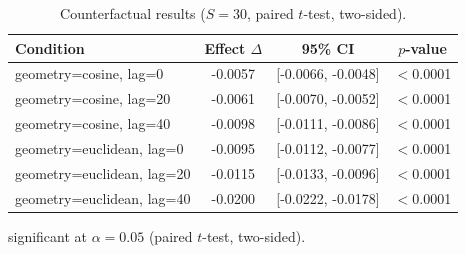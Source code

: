 \begin{table}[t]
  \centering
  \caption{Counterfactual results ($S=30$, paired $t$-test, two-sided).}
  \label{tab:counterfactual}
  \begin{tabular}{lccc}
    \toprule
    Condition & Effect $\Delta$ & 95\% CI & $p$-value \\
    \midrule
    geometry=cosine, lag=0 & -0.0057\dag{} & [-0.0066, -0.0048] & $<$0.0001 \\
    geometry=cosine, lag=20 & -0.0061\dag{} & [-0.0070, -0.0052] & $<$0.0001 \\
    geometry=cosine, lag=40 & -0.0098\dag{} & [-0.0111, -0.0086] & $<$0.0001 \\
    geometry=euclidean, lag=0 & -0.0095\dag{} & [-0.0112, -0.0077] & $<$0.0001 \\
    geometry=euclidean, lag=20 & -0.0115\dag{} & [-0.0133, -0.0096] & $<$0.0001 \\
    geometry=euclidean, lag=40 & -0.0200\dag{} & [-0.0222, -0.0178] & $<$0.0001 \\
    \bottomrule
  \end{tabular}
  \begin{minipage}{\linewidth}
    \vspace{4pt}
    \footnotesize \dag{} significant at $\alpha = 0.05$ (paired $t$-test, two-sided).
  \end{minipage}
\end{table}
